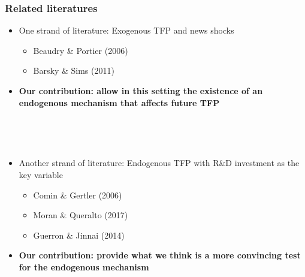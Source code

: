 \documentclass{beamer}
\begin{document}
\begin{frame}
	\frametitle{Related literatures}
	\label{related_lit}
\begin{itemize}
\item One strand of literature: Exogenous TFP and news shocks
	\begin{itemize}
	\item Beaudry \& Portier (2006)
	\item Barsky \& Sims (2011)
	
	\end{itemize}
\item [] \textbf{Our contribution: allow in this setting the existence of an endogenous mechanism that affects future TFP}	

	\
	
	\
	
\item Another strand of literature: Endogenous TFP with R\&D investment as the key variable
	\begin{itemize}
	\item Comin \& Gertler (2006)
	\item Moran \& Queralto (2017)
	\item Guerron \& Jinnai (2014)
	
	\end{itemize}	


\item []  \textbf{Our contribution: provide what we think is a more convincing test for the endogenous mechanism}


\end{itemize}



\end{frame}
\end{document}
